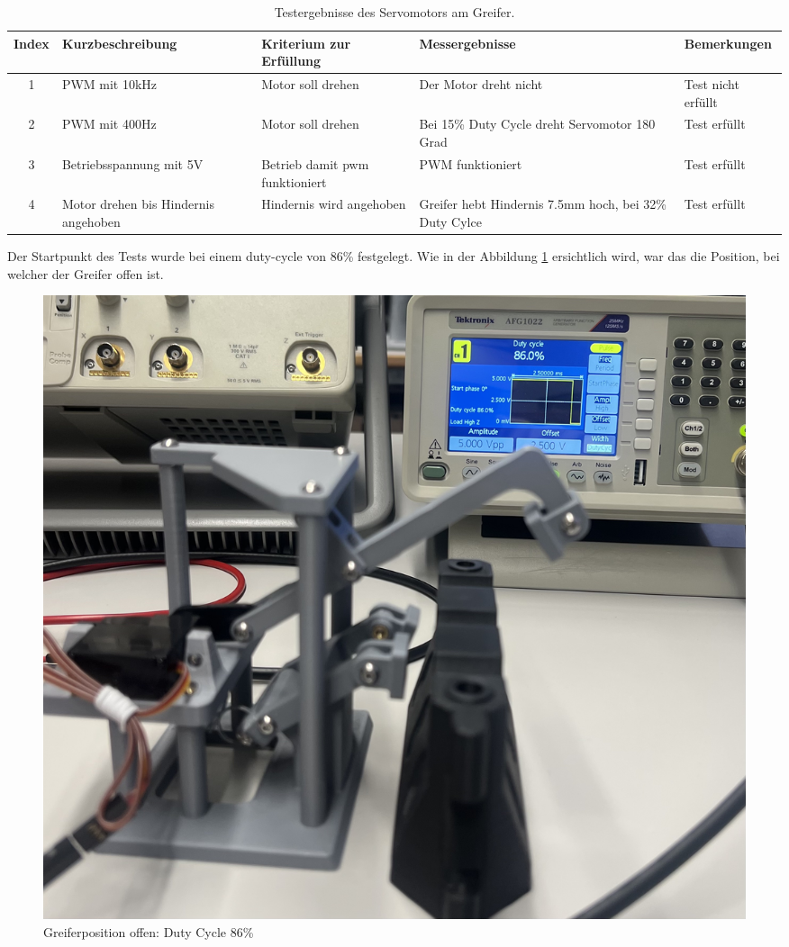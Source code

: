 \begin{table}[H]
\centering
\small
\begin{tabularx}{\textwidth}{|c|X|X|X|l|}
        \hline
        \textbf{Index} & \textbf{Kurzbeschreibung} & \textbf{Kriterium zur Erfüllung} & \textbf{Messergebnisse} & \textbf{Bemerkungen} \\
        \hline
        1 & PWM mit 10kHz & Motor soll drehen & Der Motor dreht nicht & Test nicht erfüllt \\ \hline
        2 & PWM mit 400Hz & Motor soll drehen & Bei 15\% Duty Cycle dreht Servomotor 180 Grad & Test erfüllt \\ \hline
        3 & Betriebsspannung mit 5V & Betrieb damit \acrshort{pwm} funktioniert  & PWM funktioniert & Test erfüllt\\ \hline
        4 & Motor drehen bis Hindernis angehoben & Hindernis wird angehoben & Greifer hebt Hindernis 7.5mm hoch, bei 32\% Duty Cylce & Test erfüllt \\ \hline
\end{tabularx}
    \caption{Testergebnisse des Servomotors am Greifer.}
\label{tab:testpunkte Servomotor}
\end{table}

\newpage

Der Startpunkt des Tests wurde bei einem \gls{duty-cycle} von 86\% festgelegt. Wie in der Abbildung \ref{fig: Greiferposition offen: Duty Cycle 86} ersichtlich wird, war das die Position, bei welcher der Greifer offen ist.

\begin{figure}[H]
    \centering
    \includegraphics[width=0.8\linewidth]{img/ServoGreifferoffen.jpeg}
    \caption{Greiferposition offen: Duty Cycle 86\%}
    \label{fig: Greiferposition offen: Duty Cycle 86}
\end{figure}

